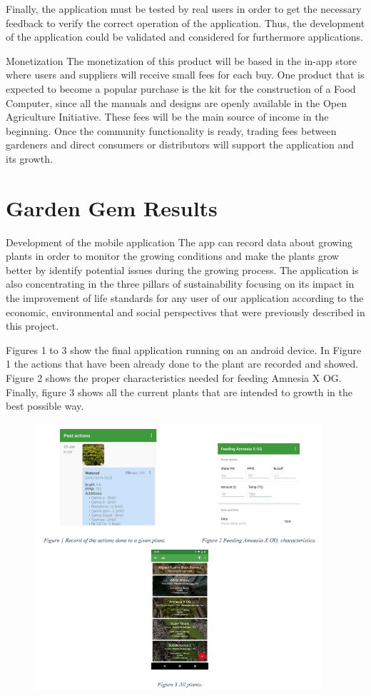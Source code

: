 Finally, the application must be tested by real users in order to get the necessary feedback to verify the correct operation of the application. Thus, the development of the application could be validated and considered for furthermore applications.

Monetization
The monetization of this product will be based in the in-app store where users and suppliers will receive small fees for each buy. One product that is expected to become a popular purchase is the kit for the construction of a Food Computer, since all the manuals and designs are openly available in the Open Agriculture Initiative. These fees will be the main source of income in the beginning. Once the community functionality is ready, trading fees between gardeners and direct consumers or distributors will support the application and its growth.


\section{Garden Gem Results}

Development of the mobile application
The app can record data about growing plants in order to monitor the growing conditions and make the plants grow better by identify potential issues during the growing process. The application is also concentrating in the three pillars of sustainability focusing on its impact in the improvement of life standards for any user of our application according to the economic, environmental and social perspectives that were previously described in this project.

Figures 1 to 3 show the final application running on an android device. In Figure 1 the actions that have been already done to the plant are recorded and showed. Figure 2 shows the proper characteristics needed for feeding Amnesia X OG. Finally, figure 3 shows all the current plants that are intended to growth in the best possible way.

\begin{figure}[th]
\centering
\includegraphics[width=0.95\textwidth]{./Figures/theApp.png}
\decoRule
\end{figure}

